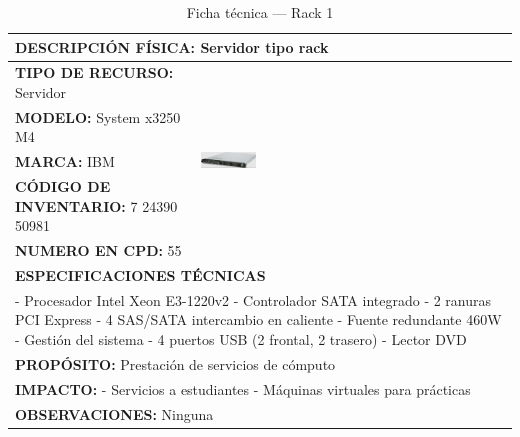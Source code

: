 \begin{table}[H]
\centering
\scriptsize
\setlength{\tabcolsep}{2pt}
\renewcommand{\arraystretch}{1.0}
\caption{Ficha técnica --- Rack 1}
\label{tab:rack-1}
\begin{tabular}{|p{}|p{}|}
\hline
\multicolumn{2}{|l|}{\textbf{DESCRIPCIÓN FÍSICA:} Servidor tipo rack} \\ \hline
\textbf{TIPO DE RECURSO:} Servidor & 
\multirow{5}{*}{\includegraphics[width=0.18\textwidth,keepaspectratio]{tablas-images/cp1/racks/rack-1.png}} \\ \cline{1-1}
\textbf{MODELO:} System x3250 M4 & \\ \cline{1-1}
\textbf{MARCA:} IBM & \\ \cline{1-1}
\textbf{CÓDIGO DE INVENTARIO:} 7 24390 50981 & \\ \cline{1-1}
\textbf{NUMERO EN CPD:} 55 & \\ \hline
\multicolumn{2}{|l|}{\textbf{ESPECIFICACIONES TÉCNICAS}} \\ \hline
\multicolumn{2}{|p{0.7\textwidth}|}{
- Procesador Intel Xeon E3-1220v2
- Controlador SATA integrado
- 2 ranuras PCI Express
- 4 SAS/SATA intercambio en caliente
- Fuente redundante 460W
- Gestión del sistema
- 4 puertos USB (2 frontal, 2 trasero)
- Lector DVD
} \\ \hline
\multicolumn{2}{|l|}{\textbf{PROPÓSITO:} Prestación de servicios de cómputo} \\ \hline
\multicolumn{2}{|p{0.7\textwidth}|}{\textbf{IMPACTO:} 
- Servicios a estudiantes
- Máquinas virtuales para prácticas} \\ \hline
\multicolumn{2}{|p{0.7\textwidth}|}{\textbf{OBSERVACIONES:} Ninguna} \\ \hline
\end{tabular}
\end{table}

